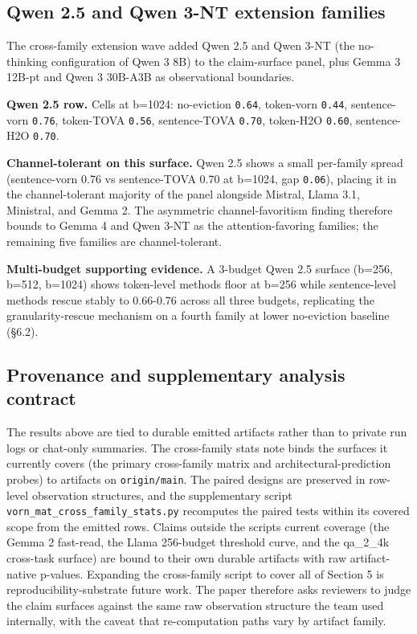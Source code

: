 \documentclass[10pt]{article}
\begin{document}
\subsection{Qwen 2.5 and Qwen 3-NT extension families}\label{58-qwen-25-7b-inverts-the-channel-favoritism-axis}

The cross-family extension wave added Qwen 2.5 and Qwen 3-NT (the
no-thinking configuration of Qwen 3 8B) to the claim-surface panel,
plus Gemma 3 12B-pt and Qwen 3 30B-A3B as observational boundaries.

\textbf{Qwen 2.5 row.} Cells at b=1024: no-eviction \texttt{0.64},
token-vorn \texttt{0.44}, sentence-vorn \texttt{0.76}, token-TOVA
\texttt{0.56}, sentence-TOVA \texttt{0.70}, token-H2O \texttt{0.60},
sentence-H2O \texttt{0.70}.

\textbf{Channel-tolerant on this surface.} Qwen 2.5 shows a small
per-family spread (sentence-vorn 0.76 vs sentence-TOVA 0.70 at b=1024,
gap \texttt{0.06}), placing it in the channel-tolerant majority of the
panel alongside Mistral, Llama 3.1, Ministral, and Gemma 2. The
asymmetric channel-favoritism finding therefore bounds to Gemma 4 and
Qwen 3-NT as the attention-favoring families; the remaining five
families are channel-tolerant.

\textbf{Multi-budget supporting evidence.} A 3-budget Qwen 2.5 surface
(b=256, b=512, b=1024) shows token-level methods floor at b=256 while
sentence-level methods rescue stably to 0.66-0.76 across all three
budgets, replicating the granularity-rescue mechanism on a fourth
family at lower no-eviction baseline (\S{}6.2).

\subsection{Provenance and supplementary analysis contract}\label{59-provenance-and-supplementary-analysis-contract}

The results above are tied to durable emitted artifacts rather than to
private run logs or chat-only summaries. The cross-family stats note
binds the surfaces it currently covers (the primary cross-family matrix
and architectural-prediction probes) to artifacts on
\texttt{origin/main}. The paired designs are preserved in row-level
observation structures, and the supplementary script
\texttt{vorn\_mat\_cross\_family\_stats.\allowbreak{}py} recomputes the paired tests
within its covered scope from the emitted rows. Claims outside the
script\textquotesingle s current coverage (the Gemma 2 fast-read, the
Llama 256-budget threshold curve, and the qa\_2\_4k cross-task surface)
are bound to their own durable artifacts with raw artifact-native
p-values. Expanding the cross-family script to cover all of Section 5 is
reproducibility-substrate future work. The paper therefore asks
reviewers to judge the claim surfaces against the same raw observation
structure the team used internally, with the caveat that re-computation
paths vary by artifact family.
\end{document}
